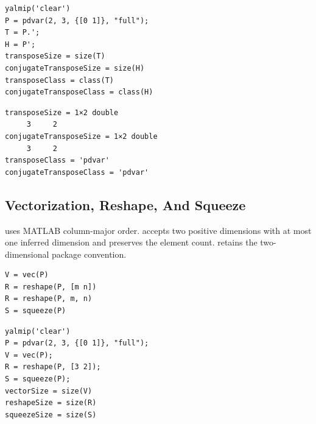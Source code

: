 \examplehead
\begin{lstlisting}[style=dpmatlab]
yalmip('clear')
P = pdvar(2, 3, {[0 1]}, "full");
T = P.';
H = P';
transposeSize = size(T)
conjugateTransposeSize = size(H)
transposeClass = class(T)
conjugateTransposeClass = class(H)
\end{lstlisting}

\begin{lstlisting}[style=dpoutput]
transposeSize = 1×2 double
     3     2
conjugateTransposeSize = 1×2 double
     3     2
transposeClass = 'pdvar'
conjugateTransposeClass = 'pdvar'
\end{lstlisting}

\begin{center}
\end{center}

\subsection{Vectorization, Reshape, And Squeeze}

 uses MATLAB column-major order.   accepts two positive dimensions with at most one inferred \code{[]} dimension and preserves the element count.   retains the two-dimensional package convention.

\syntaxhead
\begin{lstlisting}[style=dpsyntax]
V = vec(P)
R = reshape(P, [m n])
R = reshape(P, m, n)
S = squeeze(P)
\end{lstlisting}

\examplehead
\begin{lstlisting}[style=dpmatlab]
yalmip('clear')
P = pdvar(2, 3, {[0 1]}, "full");
V = vec(P);
R = reshape(P, [3 2]);
S = squeeze(P);
vectorSize = size(V)
reshapeSize = size(R)
squeezeSize = size(S)
\end{lstlisting}

